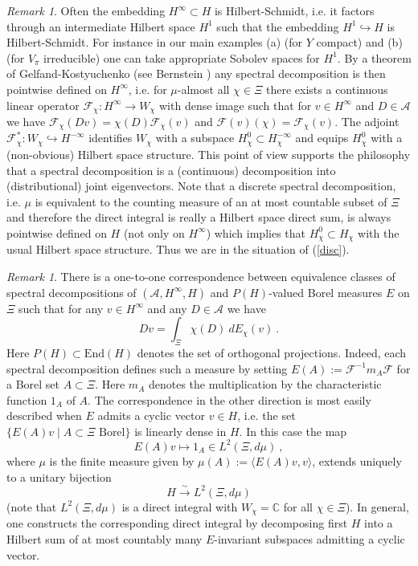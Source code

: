 \documentclass[10]{amsart}
\theoremstyle{remark}
\newtheorem{rem}[thm]{Remark}
\theoremstyle{definition}
\numberwithin{equation}{section}
\newcommand{\C}{\mathbb{C}}           %
\newcommand{\End}{\text{End}}
\newcommand{\Cal}{\mathcal}
\newcommand{\defn}{{:=}}
\begin{document}
{\begin{rem}\label{bernstein} 
Often the embedding $H^\infty\subset H$ is Hilbert-Schmidt, i.e. it factors through an intermediate Hilbert space $H^1$ such that the embedding $H^1\hookrightarrow H$
is Hilbert-Schmidt. For instance in our main examples (a) (for $Y$ compact) and (b) (for $V_\pi$ irreducible) one can take appropriate Sobolev spaces for $H^1$. By a theorem of
Gelfand-Kostyuchenko (see Bernstein \cite{Ber88}) any spectral decomposition is then pointwise defined on $H^\infty$, i.e. for $\mu$-almost all $\chi\in\Xi$ there exists a continuous
linear operator $\Cal F_\chi: H^\infty\rightarrow W_\chi$ with dense image such that for $v\in H^\infty$ and $D\in\Cal A$ we have $\Cal F_\chi(Dv)=\chi(D)\Cal F_\chi(v)$  and
$\Cal F(v)(\chi)=\Cal F_\chi(v)$. The adjoint $\Cal F_\chi^*: W_\chi\hookrightarrow H^{-\infty}$ identifies $W_\chi$ with a subspace $H_\chi^0\subset H_\chi^{-\infty}$
and equips $H_\chi^0$ with a (non-obvious) Hilbert space structure. This point of view supports the philosophy that a spectral decomposition is a (continuous) decomposition into (distributional)
joint eigenvectors. Note that a discrete spectral decomposition, i.e. $\mu$ is equivalent to the counting measure of an at most countable subset of $\Xi$ and therefore
the direct integral is really a Hilbert space direct sum, is always pointwise defined on $H$ (not only on $H^\infty$) which implies that $H_\chi^0\subset H_\chi$ with the usual Hilbert space structure. Thus we are in the situation of (\ref{disc}).
\end{rem} 

\begin{rem}\label{plums} There is a one-to-one correspondence between equivalence classes of spectral decompositions of $(\Cal A, H^\infty, H)$ and $P(H)$-valued
Borel measures $E$ on $\Xi$ such that for any $v\in H^\infty$ and any $D\in\Cal A$ we  have
$$ Dv = \int_\Xi \chi(D)\: dE_\chi(v) \ .$$
Here $P(H)\subset \End(H)$ denotes the set of orthogonal projections. Indeed, each spectral decomposition defines such a measure by setting $E(A)\defn \Cal F^{-1}m_A\Cal F$ for a Borel set $A\subset \Xi$. Here $m_A$ denotes the multiplication by the characteristic function $1_A$ of $A$. The correspondence in the other direction is most easily described
when $E$ admits a cyclic vector $v\in H$, i.e. the set $\{E(A)v\mid A\subset \Xi\mbox{ Borel}\}$ is linearly dense in $H$. In this case the map
$$ E(A)v\mapsto 1_A\in L^2(\Xi, d\mu)\ ,$$
where $\mu$ is the finite measure given by $\mu(A)\defn \langle E(A)v,v\rangle$, extends uniquely to a unitary bijection
$$ H\stackrel{\sim}{\longrightarrow} L^2(\Xi, d\mu)$$
(note that $L^2(\Xi, d\mu)$ is a direct integral with $W_\chi=\C$ for all $\chi\in\Xi$). In general, one constructs the corresponding direct integral by decomposing first $H$ into a Hilbert sum of at
most countably many $E$-invariant subspaces admitting a cyclic vector.
\end{rem} 

}
\end{document}
